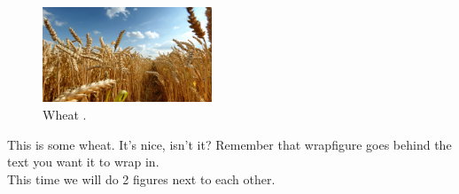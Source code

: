 \documentclass[a4paper]{report}
\begin{document}
\newpage

\begin{figure}
	
	\centering
	
	\includegraphics[width = 0.45\textwidth]{Wheat}
	\caption{Wheat \cite{Nature}.}
	
\end{figure}

This is some wheat. It's nice, isn't it? Remember that wrapfigure goes behind the text you want it to wrap in.\\

This time we will do 2 figures next to each other.\\\\
\\
\\


\end{document}

